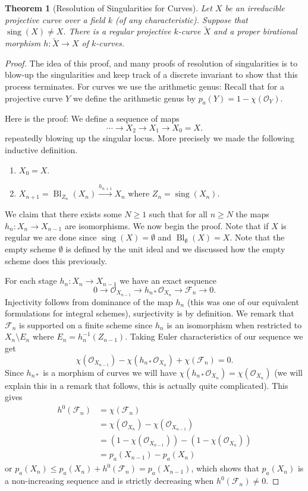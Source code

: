 \documentclass[12pt]{article}
\numberwithin{equation}{section}
\newtheorem{theorem}{Theorem}[subsection]
\theoremstyle{definition}
\theoremstyle{remark}
\newcommand{\Ocal}{\mathcal{O}}
\newcommand{\Bl}{\operatorname{Bl}}
\newcommand{\Fcal}{\mathcal{F}}
\newcommand{\sing}{\operatorname{sing}}
\begin{document}
\begin{theorem}[Resolution of Singularities for Curves]
	Let $X$ be an irreducible projective curve over a field $k$ (of any characteristic). 
	Suppose that $\sing(X)\neq X$. 
	There is a regular projective $k$-curve $\widetilde{X}$ and a proper birational morphism $h:\widetilde{X} \to X$ of $k$-curves.  
\end{theorem}
\begin{proof}
	The idea of this proof, and many proofs of resolution of singularities is to blow-up the singularities and keep track of a discrete invariant to show that this process terminates. 
	For curves we use the arithmetic genus:
	Recall that for a projective curve $Y$ we define the arithmetic genus by $p_a(Y) = 1-\chi(\Ocal_Y)$.
	
	Here is the proof: 
	We define a sequence of maps 
	$$ \cdots \to X_2 \to X_1 \to X_0=X. $$
	repeatedly blowing up the singular locus.
	More precisely we made the following inductive definition.
	\begin{enumerate}
		\item $X_0=X$.
		\item $X_{n+1} = \Bl_{Z_n}(X_n) \xrightarrow{h_{n+1}} X_n$ where $Z_n = \sing(X_n)$.
	\end{enumerate}
	We claim that there exists some $N\geq 1$ such that for all $n\geq N$ the maps $h_n: X_n \to X_{n-1}$ are isomorphisms. 
	We now begin the proof. 
	Note that if $X$ is regular we are done since $\sing(X)=\emptyset$ and $\Bl_{\emptyset}(X)=X$. 
	Note that the empty scheme $\emptyset$ is defined by the unit ideal and we discussed how the empty scheme does this previously. 
	
	For each stage $h_n:X_n \to X_{n-1}$ we have an exact sequence 
	$$0 \to \Ocal_{X_{n-1}} \to h_{n*}\Ocal_{X_n} \to \Fcal_n \to 0. $$
	Injectivity follows from dominance of the map $h_n$ (this was one of our equivalent formulations for integral schemes), surjectivity is by definition. 
	We remark that $\Fcal_n$ is supported on a finite scheme since $h_n$ is an isomorphism when restricted to $X_n\setminus E_n$ where $E_n=h_n^{-1}(Z_{n-1})$.
	Taking Euler characteristics of our sequence we get 
	$$\chi(\Ocal_{X_{n-1}}) - \chi(h_{n*}\Ocal_{X_n}) + \chi(\Fcal_n) =0.$$
	Since $h_{n*}$ is a morphism of curves we will have $\chi(h_{n*}\Ocal_{X_n}) =\chi(\Ocal_{X_n})$ (we will explain this in a remark that follows, this is actually quite complicated). 
	This gives 
	\begin{align*}
	h^0(\Fcal_n) &= \chi(\Fcal_n) \\
	&= \chi(\Ocal_{X_n}) - \chi(\Ocal_{X_{n-1}}) \\
	&=(1-\chi(\Ocal_{X_{n-1}})) - (1-\chi(\Ocal_{X_n})) \\
	&= p_a(X_{n-1}) - p_a(X_n) 
	\end{align*}
	or $p_a(X_n) \leq p_a(X_n) + h^0(\Fcal_n) = p_a(X_{n-1})$, which shows that $p_a(X_n)$ is a non-increasing sequence and is strictly decreasing when $h^0(\Fcal_n)\neq 0$. 
	

\end{proof}
\end{document}
